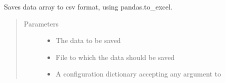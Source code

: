 \documentclass[letterpaper,10pt,english]{sphinxmanual}
\begin{document}
\begin{fulllineitems}
\label{\detokenize{api:muse.outputs.sinks.to_excel}}
Saves data array to csv format, using pandas.to\_excel.
\begin{quote}\begin{description}
\item[{Parameters}] \leavevmode\begin{itemize}
\item {} 
 \textendash{} The data to be saved

\item {} 
 \textendash{} File to which the data should be saved

\item {} 
 \textendash{} A configuration dictionary accepting any argument to 

\end{itemize}

\end{description}\end{quote}

\end{fulllineitems}

\end{document}
